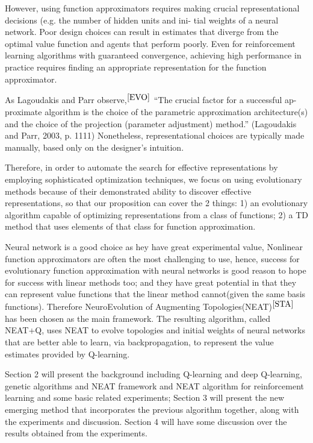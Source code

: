 \documentclass[journal]{IEEEtran}
\begin{document}
However, using function approximators requires making crucial representational decisions (e.g. the number of hidden units and ini- tial weights of a neural network. 
Poor design choices can result in estimates that diverge from the optimal value function and agents that perform poorly. Even for reinforcement learning algorithms 
with guaranteed convergence, achieving high performance in practice requires finding an appropriate representation for the function approximator. 

As Lagoudakis and Parr observe,$^{\cite{EVO}}$ “The crucial factor for a successful ap- proximate algorithm is the choice of the parametric approximation architecture(s) and the choice of the projection (parameter adjustment) method.” (Lagoudakis and Parr, 2003, p. 1111) Nonetheless, representational choices are typically made manually, based only on the designer’s intuition.

Therefore, in order to automate the search for effective representations by employing sophisticated optimization techniques, we focus on using evolutionary methods 
because of their demonstrated ability to discover effective representations, so that our proposition can cover the 2 things: 1) an evolutionary algorithm capable of optimizing representations from a class of functions; 2) a TD method that uses elements of that class for function approximation. 

Neural network is a good choice as hey have great experimental value, Nonlinear function approximators are often the most challenging to use, hence, success for evolutionary function approximation with neural networks is good reason to hope for success with linear methods too;
and they have great potential in that they can represent value functions that the linear method cannot(given the same basis functions). Therefore NeuroEvolution of Augmenting Topologies(NEAT)$^{\cite{STA}}$ has been chosen as the main 
framework. The resulting algorithm, called NEAT+Q, uses NEAT to evolve topologies and initial weights of neural networks that are better able to learn, via backpropagation, to represent the value estimates provided by Q-learning.

Section 2 will present the background including Q-learning and deep Q-learning, genetic algorithms and NEAT framework and NEAT algorithm for reinforcement learning and some basic related experiments;
Section 3 will present the new emerging method that incorporates the previous algorithm together, along with the experiments and discussion.
Section 4 will have some discussion over the results obtained from the experiments.
\end{document}

